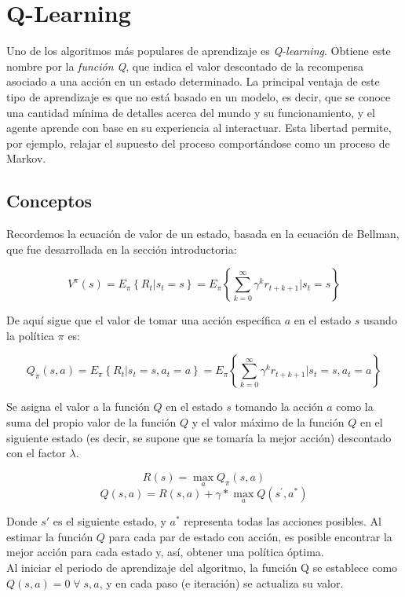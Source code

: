 \section{Q-Learning}

Uno de los algoritmos m\'as populares de aprendizaje es \textit{Q-learning}. Obtiene este nombre por la \textit{funci\'on Q}, que indica el valor descontado de la recompensa asociado a una acci\'on en un estado determinado. La principal ventaja de este tipo de aprendizaje es que no est\'a basado en un modelo, es decir, que se conoce una cantidad m\'inima de detalles acerca del mundo y su funcionamiento, y el agente aprende con base en su experiencia al interactuar. Esta libertad permite, por ejemplo, relajar el supuesto del proceso comport\'andose como un proceso de Markov.

\subsection{Conceptos}

Recordemos la ecuaci\'on de valor de un estado, basada en la ecuaci\'on de Bellman, que fue desarrollada en la secci\'on introductoria:

$$
V^{\pi}(s) = E_{\pi}\left\{R_{t}|s_{t} = s\right\} = E_{\pi}\left\{\sum_{k=0}^{\infty}\gamma^{k}r_{t+k+1} \big| s_{t}=s\right\}
$$

De aqu\'i sigue que el valor de tomar una acci\'on espec\'ifica $a$ en el estado $s$ usando la pol\'itica $\pi$ es:

$$
    Q_{\pi}(s,a) = E_{\pi}\left\{R_{t}|s_{t}=s,a_{t}=a\right\}=E_{\pi}\left \{\sum_{k = 0}^{\infty}\gamma^{k}r_{t+k+1} \big| s_{t} =s, a_{t} =a  \right \}
$$

Se asigna el valor a la funci\'on $Q$ en el estado $s$ tomando la acci\'on $a$ como la suma del propio valor de la funci\'on $Q$ y el valor m\'aximo de la funci\'on $Q$ en el siguiente estado (es decir, se supone que se tomar\'ia la mejor acci\'on) descontado con el factor $\lambda$.

$$
R(s) = \max_{a}{Q_{\pi}(s,a)}
$$
$$
Q(s, a) = R(s, a) + \gamma * \max_{a}{Q(s^{'}, a^{*})}
$$

Donde $s{'}$ es el siguiente estado, y $a^{*}$ representa todas las acciones posibles. Al estimar la funci\'on $Q$ para cada par de estado con acci\'on, es posible encontrar la mejor acci\'on para cada estado y, as\'i, obtener una pol\'itica \'optima.\\

Al iniciar el periodo de aprendizaje del algoritmo, la funci\'on Q se establece como $Q(s,a) = 0 \; \forall \; s, a$, y en cada paso (e iteraci\'on) se actualiza su valor.


